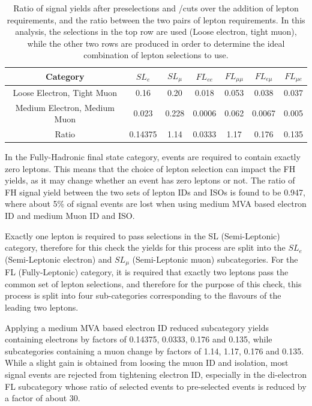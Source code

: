 \begin{table}[htbp]
    \begin{center}
            \begin{tabular}{|c|c|c|c|c|c|c|}
                    \hline
                    Category & $SL_{e}$ & $SL_{\mu} $ & $FL_{ee}$ & $FL_{\mu\mu}$ & $FL_{e\mu}$ & $FL_{\mu e}$ \\
                    \hline
                    Loose Electron, Tight Muon   & 0.16 & 0.20 & 0.018  & 0.053 & 0.038 & 0.037  \\
                    \hline
                    Medium Electron, Medium Muon  & 0.023 & 0.228 & 0.0006  & 0.062 & 0.0067 & 0.005 \\
                    \hline
                    Ratio & 0.14375 & 1.14 & 0.0333 & 1.17 & 0.176 & 0.135 \\
                    \hline
            \end{tabular}
    \end{center}
    \caption{Ratio of signal yields after preselections and \pt/\mgg cuts over the addition of lepton requirements, and the ratio between the two pairs of lepton requirements. In this analysis, the selections in the top row are used (Loose electron, tight muon), while the other two rows are produced in order to determine the ideal combination of lepton selections to use. \label{tab:LeptonSelectionYields}}
\end{table}

In the Fully-Hadronic final state category, events are required to contain exactly zero leptons. This means that the choice of lepton selection can impact the FH yields, as it may change whether an event has zero leptons or not. The ratio of FH signal yield between the two sets of lepton IDs and ISOs is found to be
0.947, where about 5\% of signal events are lost when using medium MVA based electron ID and medium Muon ID and ISO.

Exactly one lepton is required to pass selections in the SL (Semi-Leptonic) category, therefore for this check the yields for this process are split into the $SL_{e}$ (Semi-Leptonic electron) and $SL_{\mu}$ (Semi-Leptonic muon)
subcategories. For the FL (Fully-Leptonic) category, it is required that exactly two leptons pass the common set of lepton selections, and therefore for the purpose of this check, this process is split into four sub-categories corresponding to the flavours of the
leading two leptons. 

Applying a medium MVA based electron ID reduced subcategory yields containing electrons by factors of 0.14375, 0.0333, 0.176 and 0.135, while subcategories containing a muon
change by factors of 1.14, 1.17, 0.176 and 0.135. While a slight gain is obtained from loosing the muon ID and isolation, most signal events are rejected from tightening electron ID, especially
in the di-electron FL subcategory whose ratio of selected events to pre-selected events is reduced by a factor of about 30.

